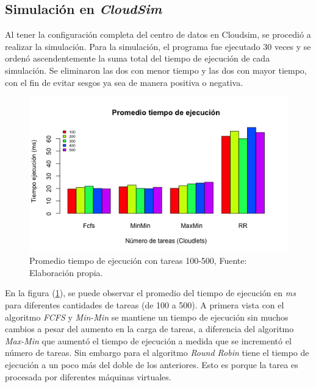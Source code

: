 \documentclass[jou,apacite]{apa6}
\begin{document}
\subsection{Simulación en \textit{CloudSim}}

Al tener la configuración completa del centro de datos en Cloudsim, se procedió a realizar la simulación.
Para la simulación, el programa fue ejecutado 30 veces y se ordenó ascendentemente la suma total del tiempo de ejecución de cada simulación. Se eliminaron las dos con menor tiempo y las dos con mayor tiempo, con el fin de evitar sesgos ya sea de manera positiva o negativa.

\renewcommand\thefigure{\arabic{figure}}
\begin{figure}[h!] 
	\centering
	\includegraphics[scale=0.5]{media/tiempoejecucionjpg}
	\caption{Promedio tiempo de ejecuci\'on con tareas 100-500, Fuente: Elaboraci\'on propia.}
	\label{fig:tiempo}
\end{figure}



En la figura (\ref{fig:tiempo}), se puede observar el promedio del tiempo de ejecuci\'on en \emph{ms} para diferentes cantidades de tareas (de 100 a 500). A primera vista con el algoritmo \textit{FCFS} y \textit{Min-Min} se mantiene un tiempo de ejecuci\'on sin muchos cambios a pesar del aumento en la carga de tareas, a diferencia del algoritmo \textit{Max-Min} que aument\'o el tiempo de ejecuci\'on a medida que se increment\'o el n\'umero de tareas. Sin embargo para el algoritmo \textit{Round Robin} tiene el tiempo de ejecución a un poco más del doble de los anteriores. Esto es porque la tarea es procesada por diferentes máquinas virtuales.

\label{etiqueta}
\end{document}
